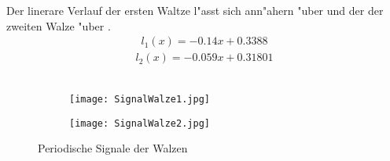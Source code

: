 Der linerare Verlauf der ersten Waltze l"asst sich ann"ahern "uber  und der der zweiten Walze "uber .
\begin{align}
{l_1(x)}=-0.14x+0.3388
\label{eq:Spalthoehe1}
\end{align}
\begin{align}
{l_2(x)}=-0.059x+0.31801
\label{eq:Spalthoehe2}
\end{align}\\
\begin{figure}[h]
	\centering
	\begin{subfigure}[c]{0.5\textwidth}		
		\texttt{[image: SignalWalze1.jpg]}
	\end{subfigure}
	\begin{subfigure}[c]{0.5\textwidth}
		\texttt{[image: SignalWalze2.jpg]}
	\end{subfigure}
	\caption{Periodische Signale der Walzen}
	\label{fig:signal}
\end{figure}\\


